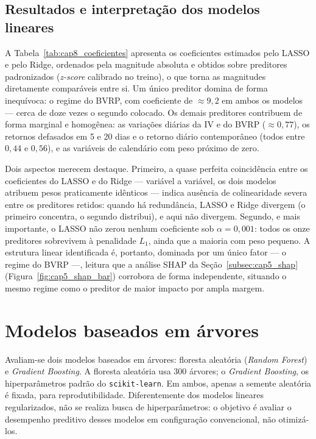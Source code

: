 
\subsection{Resultados e interpretação dos modelos lineares}
\label{subsec:cap5_lineares_coeficientes}

A Tabela~\ref{tab:cap8_coeficientes} apresenta os coeficientes estimados pelo
LASSO e pelo Ridge, ordenados pela magnitude absoluta e obtidos sobre preditores
padronizados (\textit{z-score} calibrado no treino), o que torna as magnitudes
diretamente comparáveis entre si. Um único preditor domina de forma inequívoca:
o regime do BVRP, com coeficiente de $\approx 9{,}2$ em ambos os modelos
--- cerca de doze vezes o segundo colocado. Os demais preditores contribuem de
forma marginal e homogênea: as variações diárias da IV e do BVRP ($\approx 0{,}77$),
os retornos defasados em 5 e 20 dias e o retorno diário contemporâneo (todos
entre $0{,}44$ e $0{,}56$), e as variáveis de calendário com peso próximo de zero.

Dois aspectos merecem destaque. Primeiro, a quase perfeita coincidência entre os
coeficientes do LASSO e do Ridge --- variável a variável, os dois modelos
atribuem pesos praticamente idênticos --- indica ausência de colinearidade
severa entre os preditores retidos: quando há redundância, LASSO e Ridge divergem
(o primeiro concentra, o segundo distribui), e aqui não divergem. Segundo, e mais
importante, o LASSO não zerou nenhum coeficiente sob $\alpha = 0{,}001$: todos os
onze preditores sobrevivem à penalidade $L_1$, ainda que a maioria com peso
pequeno. A estrutura linear identificada é, portanto, dominada por um único fator
--- o regime do BVRP ---, leitura que a análise SHAP da
Seção~\ref{subsec:cap5_shap} (Figura~\ref{fig:cap5_shap_bar}) corrobora de forma
independente, situando o mesmo regime como o preditor de maior impacto por ampla
margem.



\section{Modelos baseados em árvores}
\label{sec:cap5_arvores}

Avaliam-se dois modelos baseados em árvores: floresta aleatória
(\textit{Random Forest}) e \textit{Gradient Boosting}. A floresta aleatória usa
300 árvores; o \textit{Gradient Boosting}, os hiperparâmetros padrão do
\texttt{scikit-learn}. Em ambos, apenas a semente aleatória é fixada, para
reprodutibilidade. Diferentemente dos modelos lineares regularizados, não se
realiza busca de hiperparâmetros: o objetivo é avaliar o desempenho preditivo
desses modelos em configuração convencional, não otimizá-los.


